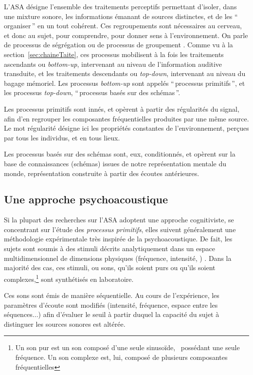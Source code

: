 {L'ASA désigne l'ensemble des traitements perceptifs permettant d'isoler, dans une mixture sonore, les informations émanant de sources distinctes, et de les ``\,organiser\,'' en un tout cohérent. Ces regroupements sont nécessaires au cerveau, et donc au sujet, pour comprendre, pour donner sens à l'environnement. On parle de processus de ségrégation ou de processus de groupement \citep{winkler2009modeling}. Comme vu à la section~\ref{sec:chaineTaite}, ces processus mobilisent à la fois les traitements ascendants ou \emph{bottom-up}, intervenant au niveau de l'information auditive transduite, et les traitements descendants ou \emph{top-down}, intervenant au niveau du bagage mémoriel. Les processus \emph{bottom-up} sont appelés ``\,processus primitifs\,'', et les processus  \emph{top-down}, ``\,processus basés sur des schémas\,''. 

Les processus primitifs sont innés, et opèrent à partir des régularités du signal, afin d'en regrouper les composantes fréquentielles produites par une même source. Le mot régularité désigne ici les propriétés constantes de l'environnement, perçues par tous les individus, et en tous lieux.

Les processus basés sur des schémas sont, eux, conditionnés, et opèrent sur la base de connaissances (schémas) issues de notre représentation mentale du monde, représentation construite à partir des écoutes antérieures.

\subsection{Une approche psychoacoustique}

Si la plupart des recherches sur l'ASA adoptent une approche cognitiviste, se concentrant sur l'étude des \emph{processus primitifs}, elles suivent généralement une méthodologie expérimentale très inspirée de la psychoacoustique. De fait, les sujets sont soumis à des stimuli décrits analytiquement dans un espace multidimensionnel de dimensions physiques (fréquence, intensité, \etc) \citep{dubois2006cognitive}. Dans la majorité des cas, ces stimuli, ou sons, qu'ils soient purs ou qu'ils soient complexes,\footnote{Un son pur est un son composé d'une seule sinusoïde, \ie~possédant une seule fréquence. Un son complexe est, lui, composé de plusieurs composantes fréquentielles} sont synthétisés en laboratoire.

Ces sons sont émis de manière séquentielle. Au cours de l'expérience, les paramètres d'écoute sont modifiés (intensité, fréquence, espace entre les séquences...) afin d'évaluer le seuil à partir duquel la capacité du sujet à distinguer les sources sonores est altérée.

}
